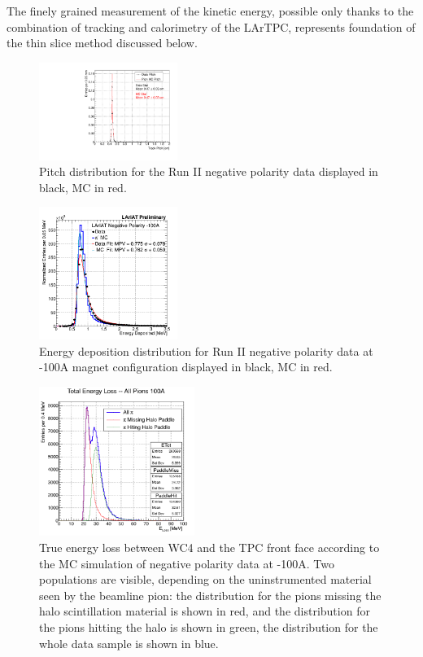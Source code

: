 \documentclass[aps,prl,twocolumn,showpacs,superscriptaddress,groupedaddress]{revtex4}  %
\begin{document}
The finely grained measurement of the kinetic energy, possible only thanks to the combination of tracking and calorimetry of the LArTPC, represents foundation of the thin slice method discussed below.\\

\begin{figure}
\includegraphics[width =0.4\textwidth ]{PitchPi}
\caption{\label{fig:pitch}  Pitch distribution for the Run II negative polarity data displayed in black, MC in red.}
\end{figure}
\begin{figure}
\includegraphics[width =0.4\textwidth ]{DepEnergy_Fit_v4100A.png}
\caption{\label{fig:enDep}  Energy deposition distribution for Run II negative polarity data at -100A magnet configuration displayed in black, MC in red.}
\end{figure}

\begin{figure}
\centering
\includegraphics[width=0.45\textwidth]{E_loss100A.png}
\caption{\label{fig:ELoss100A}  True energy loss between WC4 and the TPC front face according to the MC simulation of negative polarity data at -100A. Two populations are visible, depending on the uninstrumented material seen by the beamline pion: the distribution for the pions missing the halo scintillation material is shown in red, and the distribution for the pions hitting the halo is shown in green, the distribution for the whole data sample is shown in blue.  }
\end{figure}
\end{document}
